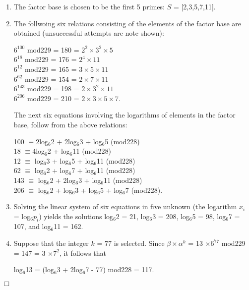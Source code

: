 \documentclass[iwp,first]{luthesis}
\begin{document}
\begin{enumerate}

\item The factor base is chosen to be the first 5 primes: $S$ = [2,3,5,7,11].

\item The follwoing six relations consisting of the elements of the factor base are obtained (unsuccessful attempts are note shown):

\begin{center}

$6^{100}$ mod229 = 180 = $2^{2} \times 3^{2} \times 5$
\\
$6^{18}$ mod229 = 176 = $2^{4} \times 11$
\\
$6^{12}$ mod229 = 165 = $3 \times 5 \times 11$
\\
$6^{62}$ mod229 = 154 = $2 \times 7 \times 11$
\\
$6^{143}$ mod229 = 198 = $2 \times 3^{2} \times 11$
\\
$6^{206}$ mod229 = 210 = $2 \times 3 \times 5 \times 7$.

\end{center}

The next six equations involving the logarithms of elements in the factor base, follow from the above relations:

\begin{center}

100 $\equiv 2$log$_{6}$2 + 2log$_{6}$3 + log$_{6}$5 (mod228)
\\
18 $\equiv 4$log$_{6}$2 + log$_{6}$11 (mod228)
\\
12 $\equiv$ log$_{6}$3 + log$_{6}$5 + log$_{6}$11 (mod228)
\\
62 $\equiv$ log$_{6}$2 + log$_{6}$7 + log$_{6}$11 (mod228)
\\
143 $\equiv$ log$_{6}$2 + 2log$_{6}$3 + log$_{6}$11 (mod228)
\\
206 $\equiv$ log$_{6}$2 + log$_{6}$3 + log$_{6}$5 + log$_{6}$7 (mod228).

\end{center}

\item Solving the linear system of six equations in five unknown (the logarithm $x_{i}$ = log$_{6}p_i$) yields the solutions log$_{6}$2 = 21, log$_{6}$3 = 208, log$_{6}$5 = 98, log$_{6}$7 = 107, and log$_{6}$11 = 162.

\item Suppose that the integer $k$ = 77 is selected. Since $\beta \times \alpha^{k}$ = 13 $\times 6^{77}$ mod229 = 147 = 3 $\times 7^2$, it follows that

\begin{center}

log$_{6}$13 = (log$_{6}$3 + 2log$_{6}$7 - 77) mod228 = 117.

\end{center}

\end{enumerate}
\hfill $\Box$
\end{document}
